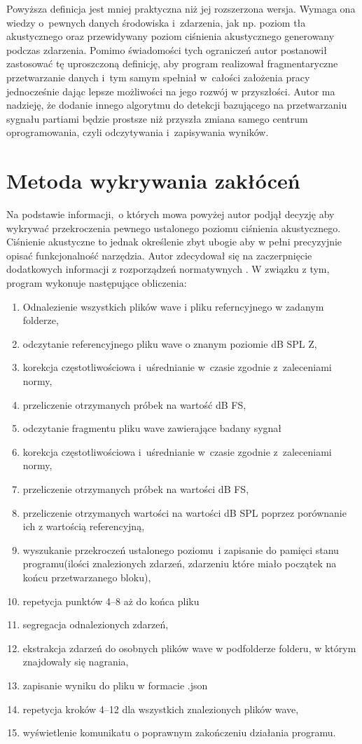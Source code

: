 \documentclass[eng,printmode]{mgr}
\begin{document}
Powyższa definicja jest mniej praktyczna niż jej rozszerzona wersja. Wymaga ona wiedzy o~pewnych danych środowiska i~zdarzenia, jak np. poziom tła akustycznego oraz przewidywany poziom ciśnienia akustycznego generowany podczas zdarzenia. Pomimo świadomości tych ograniczeń autor postanowił zastosować tę uproszczoną definicję, aby program realizował fragmentaryczne przetwarzanie danych i~tym samym spełniał w~całości założenia pracy jednocześnie dając lepsze możliwości na jego rozwój w przyszłości. Autor ma nadzieję, że dodanie innego algorytmu do detekcji bazującego na przetwarzaniu sygnału partiami będzie prostsze niż przyszła zmiana samego centrum oprogramowania, czyli odczytywania i~zapisywania wyników. 

\section{Metoda wykrywania zakłóceń}

Na podstawie informacji,~o których mowa powyżej autor podjął decyzję aby wykrywać przekroczenia pewnego ustalonego poziomu ciśnienia akustycznego. Ciśnienie akustyczne to jednak określenie zbyt ubogie aby w pełni precyzyjnie opisać funkcjonalność narzędzia. Autor zdecydował się na zaczerpnięcie dodatkowych informacji z rozporządzeń normatywnych \cite{PN-EN_61672-1:2014-03}. W związku z tym, program wykonuje następujące obliczenia:
\begin{enumerate}
\item Odnalezienie wszystkich plików wave i pliku referncyjnego w zadanym folderze,
\item odczytanie referencyjnego pliku wave o znanym poziomie dB SPL Z,
\item korekcja częstotliwościowa i~uśrednianie w~czasie zgodnie z~zaleceniami normy, \cite{PN-EN_61672-1:2014-03}
\item przeliczenie otrzymanych próbek na wartość dB FS,
\item odczytanie fragmentu pliku wave zawierające badany sygnał
\item korekcja częstotliwościowa i~uśrednianie w~czasie zgodnie z~zaleceniami normy, \cite{PN-EN_61672-1:2014-03}
\item przeliczenie otrzymanych próbek na wartości dB FS,
\item przeliczenie otrzymanych wartości na wartości dB SPL poprzez porównanie ich z wartością referencyjną,
\item wyszukanie przekroczeń ustalonego poziomu~i zapisanie do pamięci stanu programu(ilości znalezionych zdarzeń, zdarzeniu które miało początek na końcu przetwarzanego bloku),
\item repetycja punktów 4--8 aż do końca pliku
\item segregacja odnalezionych zdarzeń,
\item ekstrakcja zdarzeń do osobnych plików wave w podfolderze folderu, w którym znajdowały się nagrania,
\item zapisanie wyniku do pliku w formacie .json
\item repetycja kroków 4--12 dla wszystkich znalezionych plików wave,
\item wyświetlenie komunikatu o poprawnym zakończeniu działania programu.
\end{enumerate}
\end{document}
